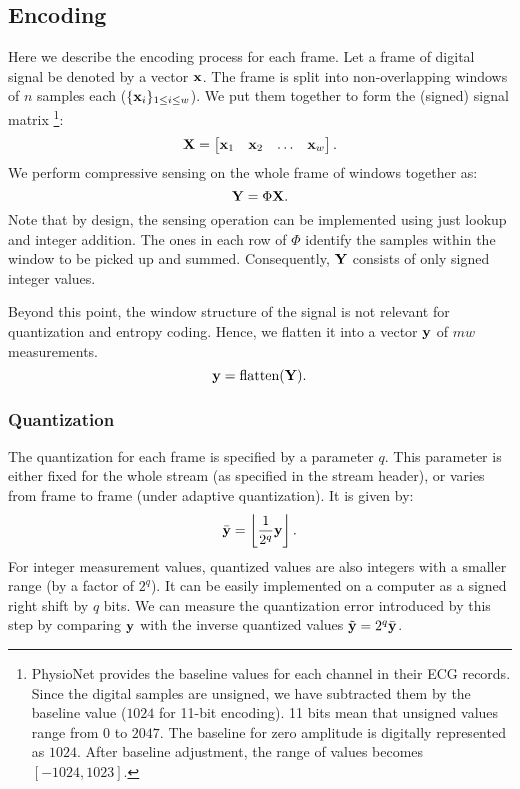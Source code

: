 \subsection{Encoding}


Here we describe the encoding process for each frame.
Let a frame of digital signal be denoted by a vector $\mathbf{x}$.
The frame is split into non-overlapping windows of $n$
samples each ($\{\mathbf{x}_i\}_{1 \le i\le w}$).
We put them together to form the (signed) signal matrix
\footnote{
PhysioNet provides the baseline values for each channel
in their ECG records.
Since the digital samples are unsigned, we have subtracted
them by the baseline value ($1024$ for 11-bit encoding).
11 bits mean that unsigned values range from
$0$ to $2047$. The baseline for zero amplitude is
digitally represented as $1024$.
After baseline adjustment, the range of values becomes
$[-1024,1023]$.
}:
\begin{equation}
\mathbf{X} = \begin{bmatrix}
\mathbf{x}_1 & \mathbf{x}_2 & \dots & \mathbf{x}_w
\end{bmatrix}.
\end{equation}
We perform compressive sensing on the whole frame
of windows together as:
\begin{equation}
\mathbf{Y} = \Phi \mathbf{X}.
\end{equation}
Note that by design, the sensing operation can be implemented
using just lookup and integer addition. The ones
in each row of $\Phi$ identify the samples within the window
to be picked up and summed. Consequently, $\mathbf{Y}$ consists of
only signed integer values.

Beyond this point, the window structure of the signal is not
relevant for quantization and entropy coding.
Hence, we flatten it into a vector $\mathbf{y}$ of $m w$ measurements.
\begin{equation}
\mathbf{y} = \text{flatten}(\mathbf{Y}).
\end{equation}
\subsubsection{Quantization}
The quantization for each frame is specified by a parameter $q$.
This parameter is either fixed for the whole stream
(as specified in the stream header),
or varies from frame to frame (under adaptive quantization).
It is given by:
\begin{equation}
\bar{\mathbf{y}} = \left \lfloor \frac{1}{2^q} \mathbf{y} \right \rfloor.
\end{equation}
For integer measurement values, quantized values are also
integers with a smaller range (by a factor of $2^q$).
It can be easily implemented on a computer as a signed
right shift by $q$ bits.
We can measure the quantization error introduced by
this step by comparing $\mathbf{y}$ with the inverse quantized values
$\tilde{\mathbf{y}} = 2^q \bar{\mathbf{y}}$.

